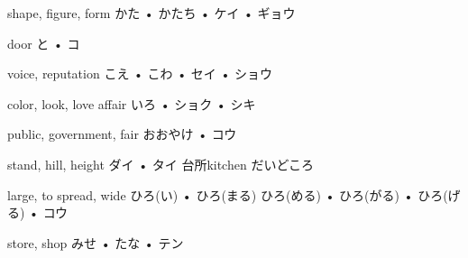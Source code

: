 



\setcounter{cardnum}{97}

		{shape, figure, form}
		{かた • かたち • ケイ • ギョウ}
		{}{}
		{}{}
		{}{}
		{}{}
		{}{}

		{door}
		{と • コ}
		{}{}
		{}{}
		{}{}
		{}{}
		{}{}

		{voice, reputation}
		{こえ • こわ • セイ • ショウ}
		{}{}
		{}{}
		{}{}
		{}{}
		{}{}

		{color, look, love affair}
		{いろ • ショク • シキ}
		{}{}
		{}{}
		{}{}
		{}{}
		{}{}

		{public, government, fair}
		{おおやけ • コウ}
		{}{}
		{}{}
		{}{}
		{}{}
		{}{}

		{stand, hill, height}
		{ダイ • タイ}
		{台所}{kitchen だいどころ}
		{}{}
		{}{}
		{}{}
		{}{}

		{large, to spread, wide}
		{ひろ(い) • ひろ(まる) ひろ(める) • ひろ(がる) • ひろ(げる) • コウ}
		{}{}
		{}{}
		{}{}
		{}{}
		{}{}

		{store, shop}
		{みせ • たな • テン}
		{}{}
		{}{}
		{}{}
		{}{}
		{}{}

